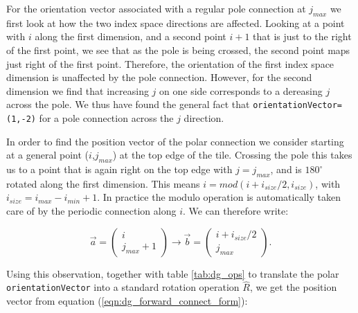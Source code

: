    For the orientation vector associated with a regular pole connection at 
   $j_{max}$ we first look at how the two index space directions are affected. 
   Looking at a point with $i$ along the first dimension, and a second point
   $i+1$ that is just to the right of the first point, we see that as the 
   pole is being crossed, the second point maps just right of the first point.
   Therefore, the orientation of the first index space dimension is unaffected
   by the pole connection. However, for the second dimension we find that
   increasing $j$ on one side corresponds to a dereasing $j$ across the pole.
   We thus have found the general fact that {\tt orientationVector=(1,-2)} for
   a pole connection across the $j$ direction.
  
   In order to find the position vector of the polar connection we consider 
   starting at a general point ($i$,$j_{max}$) at the top edge of the tile. 
   Crossing the pole this takes us to a point that is again right on the 
   top edge with $j=j_{max}$, and is $180^\circ$ rotated along the first 
   dimension. This means $i=mod(i+i_{size}/2, i_{size})$, with $i_{size}=i_{max}
   -i_{min}+1$.
   In practice the modulo operation is automatically taken care of by the
   periodic connection along $i$. We can therefore write:
  
   \begin{equation}
   \vec a = \left( \begin{array}{l}
      i \\
      j_{max}+1 \end{array} \right)
   \rightarrow
   \vec b = \left( \begin{array}{l}
      i + i_{size}/2\\
      j_{max} \end{array} \right).
   \end{equation}
  
   Using this observation, together with table \ref{tab:dg_ops} to 
   translate the polar {\tt orientationVector} into a standard rotation 
   operation $\hat R$, we get the position vector from equation
   (\ref{eqn:dg_forward_connect_form}):
   
